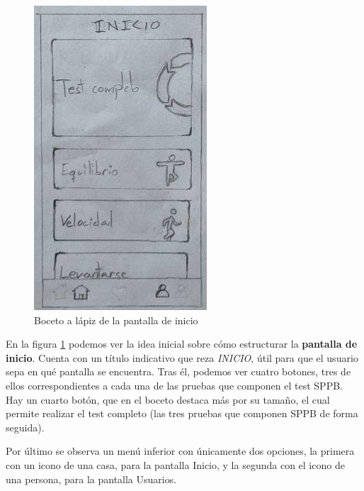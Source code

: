\begin{figure}[H]
	\centering
	\includegraphics[scale=1]{imagenes/boceto_inicio.jpg}
	\caption{Boceto a lápiz de la pantalla de inicio\label{fig:boceto_inicio}}
\end{figure}

En la figura \ref{fig:boceto_inicio} podemos ver la idea inicial sobre cómo estructurar la \textbf{pantalla de inicio}. Cuenta con un título indicativo que reza \textit{INICIO}, útil para que el usuario sepa en qué pantalla se encuentra. Tras él, podemos ver cuatro botones, tres de ellos correspondientes a cada una de las pruebas que componen el test SPPB. Hay un cuarto botón, que en el boceto destaca más por su tamaño, el cual permite realizar el test completo (las tres pruebas que componen SPPB de forma seguida).

Por último se observa un menú inferior con únicamente dos opciones, la primera con un icono de una casa, para la pantalla Inicio, y la segunda con el icono de una persona, para la pantalla Usuarios.

